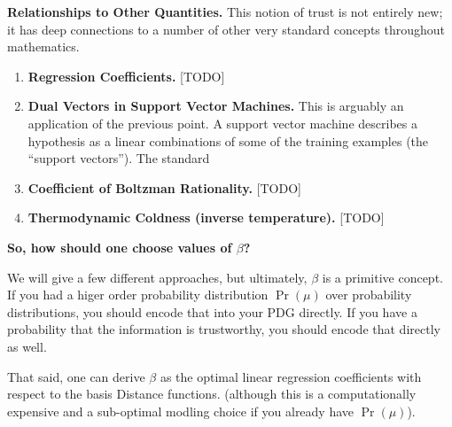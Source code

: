 \documentclass[twoside]{article} %
\theoremstyle{plain}
\theoremstyle{definition}
\begin{document}
    
    \textbf{Relationships to Other Quantities.}
    This notion of trust is not entirely new; it has deep connections to a number of other very standard concepts throughout mathematics.
    
    \begin{enumerate}
        \item \textbf{Regression Coefficients.} [TODO]
        
        \item \textbf{Dual Vectors in Support Vector Machines.} This is arguably an application of the previous point. A support vector machine describes a hypothesis as a linear combinations of some of the training examples (the ``support vectors''). The standard 
        
        \item \textbf{Coefficient of Boltzman Rationality.} [TODO]
        
        \item \textbf{Thermodynamic Coldness (inverse temperature).} [TODO]
        
    \end{enumerate}
        
    
    
    \textbf{So, how should one choose values of $\beta$?}
    
    
    We will give a few different approaches, but ultimately, $\beta$ is a primitive concept. If you had a higer order probability distribution $\Pr(\mu)$ over probability distributions, you should encode that into your PDG directly.
    If you have a probability that the information is trustworthy, you should encode that directly as well.  
    
    That said, one can derive $\beta$ as the optimal linear regression coefficients with respect to the basis Distance functions.
    (although this is a computationally expensive and a sub-optimal modling choice if you already have $\Pr(\mu)$). 
    
    
    
    
\end{document}
